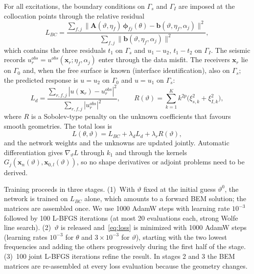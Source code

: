 \documentclass[11pt,twoside]{article}
\begin{document}
For all excitations, the boundary conditions on $\Gamma_s$ and $\Gamma_I$ are imposed at the collocation points through the relative residual
\begin{equation*}
  L_{BC} = \frac{\sum_{f,j}\bigl\|\mathbf{A}(\vartheta,\eta_f)\,\boldsymbol{\phi}_{fj}(\theta) - \mathbf{b}(\vartheta,\eta_f,\alpha_j)\bigr\|^2}
  {\sum_{f,j}\bigl\|\mathbf{b}(\vartheta,\eta_f,\alpha_j)\bigr\|^2},
\end{equation*}
which contains the three residuals $t_1$ on $\Gamma_s$ and $u_1-u_2$, $t_1-t_2$ on $\Gamma_I$. The seismic records $u^{obs}_r = u^{obs}(\mathbf{x}_r;\eta_f,\alpha_j)$ enter through the data misfit. The receivers $\mathbf{x}_r$ lie on $\Gamma_0$ and, when the free surface is known (interface identification), also on $\Gamma_s$; the predicted response is $u = u_2$ on $\Gamma_0$ and $u = u_1$ on $\Gamma_s$:
\begin{equation*}
  L_d = \frac{\sum_{r,f,j} |u(\mathbf{x}_r) - u^{obs}_r|^2}{\sum_{r,f,j} |u^{obs}_r|^2},
  \qquad
  R(\vartheta) = \sum_{k=1}^{K} k^{2p}\bigl(\xi_{s,k}^2 + \xi_{I,k}^2\bigr),
\end{equation*}
where $R$ is a Sobolev-type penalty on the unknown coefficients that favours smooth geometries. The total loss is
\begin{equation}\label{eq:loss}
  L(\theta,\vartheta) = L_{BC} + \lambda_d L_d + \lambda_r R(\vartheta),
\end{equation}
and the network weights and the unknowns are updated jointly. Automatic differentiation gives $\nabla_\vartheta L$ through $k_1$ and through the kernels $G_j(\mathbf{x}_n(\vartheta),\mathbf{x}_{0,l}(\vartheta))$, so no shape derivatives or adjoint problems need to be derived.

Training proceeds in three stages. (1)~With $\vartheta$ fixed at the initial guess $\vartheta^0$, the network is trained on $L_{BC}$ alone, which amounts to a forward BEM solution; the matrices are assembled once. We use 1000 AdamW steps \citep{Loshchilov2019} with learning rate $10^{-3}$ followed by 100 L-BFGS iterations \citep{Liu1989} (at most 20 evaluations each, strong Wolfe line search). (2)~$\vartheta$ is released and~\eqref{eq:loss} is minimized with 1000 AdamW steps (learning rates $10^{-3}$ for $\theta$ and $3\times10^{-3}$ for $\vartheta$), starting with the two lowest frequencies and adding the others progressively during the first half of the stage. (3)~100 joint L-BFGS iterations refine the result. In stages 2 and 3 the BEM matrices are re-assembled at every loss evaluation because the geometry changes.
\end{document}
